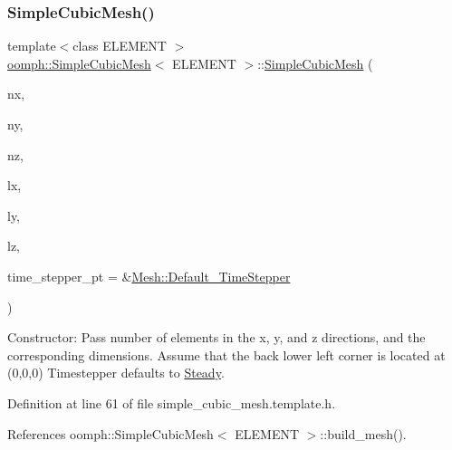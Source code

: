 \subsubsection{\texorpdfstring{Simple\+Cubic\+Mesh()}{SimpleCubicMesh()}\hspace{0.1cm}{\footnotesize\ttfamily [1/2]}}
{\footnotesize\ttfamily template$<$class E\+L\+E\+M\+E\+NT $>$ \\
\hyperlink{classoomph_1_1SimpleCubicMesh}{oomph\+::\+Simple\+Cubic\+Mesh}$<$ E\+L\+E\+M\+E\+NT $>$\+::\hyperlink{classoomph_1_1SimpleCubicMesh}{Simple\+Cubic\+Mesh} (\begin{DoxyParamCaption}\item[{const unsigned \&}]{nx,  }\item[{const unsigned \&}]{ny,  }\item[{const unsigned \&}]{nz,  }\item[{const double \&}]{lx,  }\item[{const double \&}]{ly,  }\item[{const double \&}]{lz,  }\item[{\hyperlink{classoomph_1_1TimeStepper}{Time\+Stepper} $\ast$}]{time\+\_\+stepper\+\_\+pt = {\ttfamily \&\hyperlink{classoomph_1_1Mesh_a12243d0fee2b1fcee729ee5a4777ea10}{Mesh\+::\+Default\+\_\+\+Time\+Stepper}} }\end{DoxyParamCaption})\hspace{0.3cm}{\ttfamily [inline]}}



Constructor\+: Pass number of elements in the x, y, and z directions, and the corresponding dimensions. Assume that the back lower left corner is located at (0,0,0) Timestepper defaults to \hyperlink{classoomph_1_1Steady}{Steady}. 



Definition at line 61 of file simple\+\_\+cubic\+\_\+mesh.\+template.\+h.



References oomph\+::\+Simple\+Cubic\+Mesh$<$ E\+L\+E\+M\+E\+N\+T $>$\+::build\+\_\+mesh().

\mbox{\label{classoomph_1_1SimpleCubicMesh_a22d32a0d85ab3ec9ac3e52cad0bb81d7}} 
